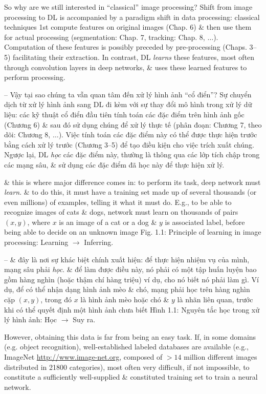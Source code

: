 \documentclass{article}
\begin{document}
\begin{itemize}
\begin{itemize}
        So why are we still interested in ``classical'' image processing? Shift from image processing to DL is accompanied by a paradigm shift in data processing: classical techniques 1st compute features on original images (Chap. 6) \& then use them for actual processing (segmentation: Chap. 7, tracking: Chap. 8, $\ldots$). Computation of these features is possibly preceded by pre-processing (Chaps. 3--5) facilitating their extraction. In contrast, DL {\it learns} these features, most often through convolution layers in deep networks, \& uses these learned features to perform processing.
        
        -- Vậy tại sao chúng ta vẫn quan tâm đến xử lý hình ảnh ``cổ điển''? Sự chuyển dịch từ xử lý hình ảnh sang DL đi kèm với sự thay đổi mô hình trong xử lý dữ liệu: các kỹ thuật cổ điển đầu tiên tính toán các đặc điểm trên hình ảnh gốc (Chương 6) \& sau đó sử dụng chúng để xử lý thực tế (phân đoạn: Chương 7, theo dõi: Chương 8, $\ldots$). Việc tính toán các đặc điểm này có thể được thực hiện trước bằng cách xử lý trước (Chương 3--5) để tạo điều kiện cho việc trích xuất chúng. Ngược lại, DL {\it học} các đặc điểm này, thường là thông qua các lớp tích chập trong các mạng sâu, \& sử dụng các đặc điểm đã học này để thực hiện xử lý.
        
        \& this is where major difference comes in: to perform its task, deep network must {\it learn}. \& to do this, it must have a training set made up of several thousands (or even millions) of examples, telling it what it must do. E.g., to be able to recognize images of cats \& dogs, network must learn on thousands of pairs $(x,y)$, where $x$ is an image of a cat or a dog \& $y$ is associated label, before being able to decide on an unknown image {\sf Fig. 1.1: Principle of learning in image processing: Learning $\to$ Inferring.}
        
        -- \& đây là nơi sự khác biệt chính xuất hiện: để thực hiện nhiệm vụ của mình, mạng sâu phải {\it học}. \& để làm được điều này, nó phải có một tập huấn luyện bao gồm hàng nghìn (hoặc thậm chí hàng triệu) ví dụ, cho nó biết nó phải làm gì. Ví dụ, để có thể nhận dạng hình ảnh mèo \& chó, mạng phải học trên hàng nghìn cặp $(x,y)$, trong đó $x$ là hình ảnh mèo hoặc chó \& $y$ là nhãn liên quan, trước khi có thể quyết định một hình ảnh chưa biết {\sf Hình 1.1: Nguyên tắc học trong xử lý hình ảnh: Học $\to$ Suy ra.}
        
        However, obtaining this data is far from being an easy task. If, in some domains (e.g. object recognition), well-established labeled databases are available (e.g., ImageNet \url{http://www.image-net.org}, composed of $> 14$ million different images distributed in 21800 categories), most often very difficult, if not impossible, to constitute a sufficiently well-supplied \& constituted training set to train a neural network.
        

\end{itemize}
\end{itemize}
\end{document}

